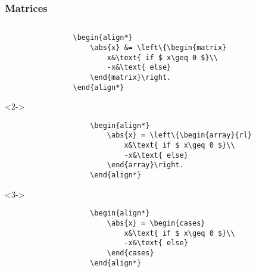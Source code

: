 \copyrightVincent

\begin{frame}[fragile]\relax
    \frametitle{Matrices}
    \begin{columns}
        \begin{column}{0.5\textwidth}
            \begin{verbatim}
                \begin{align*}
                    \abs{x} &= \left\{\begin{matrix}
                        x&\text{ if $ x\geq 0 $}\\
                        -x&\text{ else}
                    \end{matrix}\right.
                \end{align*}
            \end{verbatim}
            \begin{uncoverenv}<2->
                \begin{verbatim}
                    \begin{align*}
                        \abs{x} = \left\{\begin{array}{rl}
                            x&\text{ if $ x\geq 0 $}\\
                            -x&\text{ else}
                        \end{array}\right.
                    \end{align*}
                \end{verbatim}
            \end{uncoverenv}
            \begin{uncoverenv}<3->
                \begin{verbatim}
                    \begin{align*}
                        \abs{x} = \begin{cases}
                            x&\text{ if $ x\geq 0 $}\\
                            -x&\text{ else}
                        \end{cases}
                    \end{align*}
                \end{verbatim}
            \end{uncoverenv}
        \end{column}
        \begin{column}{0.5\textwidth}

\end{column}
\end{columns}
\end{frame}
